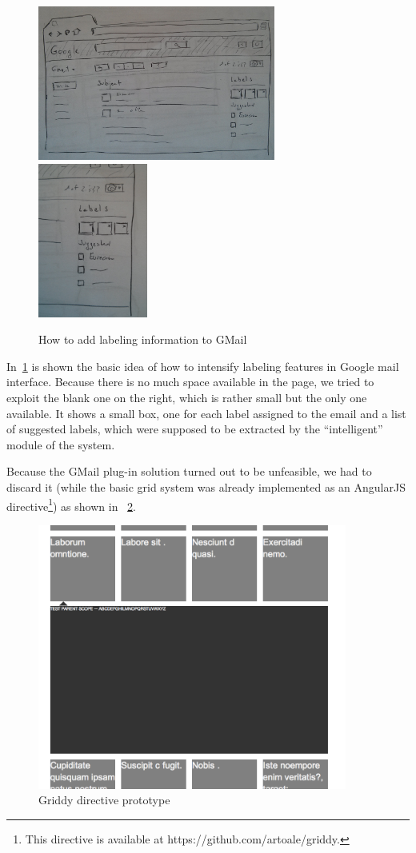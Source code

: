 \documentclass[a4paper,12pt]{report}
\begin{document}
\begin{figure}[H]
  \centering
  \includegraphics[height=2in]{old_label}
  \includegraphics[height=2in]{old_label_detail}
  \caption{How to add labeling information to GMail}
  \label{fig:old2}
\end{figure}
In~\ref{fig:old2} is shown the basic idea of how to intensify labeling features in Google mail interface. Because there is no much space available in the page, we tried to exploit the blank one on the right, which is rather small but the only one available. It shows a small box, one for each label assigned to the email and a list of suggested labels, which were supposed to be extracted by the ``intelligent'' module of the system.

Because the GMail plug-in solution turned out to be unfeasible, we had to discard it (while the basic grid system was already implemented as an AngularJS directive\footnote{This directive is available at https://github.com/artoale/griddy.}) as shown in ~\ref{fig:griddy}.
\begin{figure}[H]
  \centering
  \includegraphics[width=4in]{griddy}
  \caption{Griddy directive prototype}
  \label{fig:griddy}
\end{figure}
\end{document}
